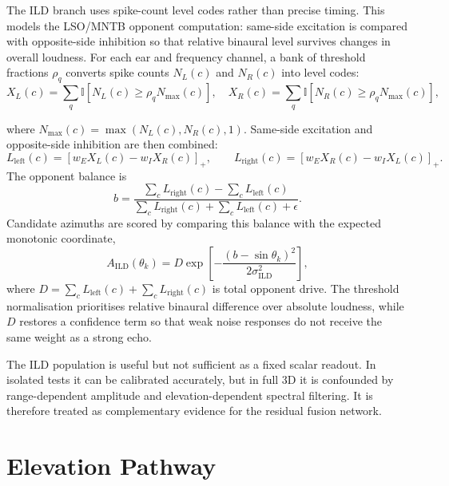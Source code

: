 The ILD branch uses spike-count level codes rather than precise timing. This models the LSO/MNTB opponent computation: same-side excitation is compared with opposite-side inhibition so that relative binaural level survives changes in overall loudness. For each ear and frequency channel, a bank of threshold fractions $\rho_q$ converts spike counts $N_L(c)$ and $N_R(c)$ into level codes:
\begin{equation}
    X_L(c)
    =
    \sum_q
    \mathbb{I}
    \left[
    N_L(c)\geq \rho_q N_{\max}(c)
    \right],
    \quad
    X_R(c)
    =
    \sum_q
    \mathbb{I}
    \left[
    N_R(c)\geq \rho_q N_{\max}(c)
    \right],
\end{equation}

where $N_{\max}(c)=\max(N_L(c),N_R(c),1)$. Same-side excitation and opposite-side inhibition are then combined:
\begin{equation}
    L_{\mathrm{left}}(c)
    =
    [w_E X_L(c)-w_I X_R(c)]_+,
    \qquad
    L_{\mathrm{right}}(c)
    =
    [w_E X_R(c)-w_I X_L(c)]_+.
\end{equation}
The opponent balance is
\begin{equation}
    b
    =
    \frac{\sum_c L_{\mathrm{right}}(c)-\sum_c L_{\mathrm{left}}(c)}
    {\sum_c L_{\mathrm{right}}(c)+\sum_c L_{\mathrm{left}}(c)+\epsilon}.
\end{equation}
Candidate azimuths are scored by comparing this balance with the expected monotonic coordinate,
\begin{equation}
    A_{\mathrm{ILD}}(\theta_k)
    =
    D\exp
    \left[
    -
    \frac{(b-\sin\theta_k)^2}{2\sigma_{\mathrm{ILD}}^2}
    \right],
\end{equation}
where $D=\sum_c L_{\mathrm{left}}(c)+\sum_c L_{\mathrm{right}}(c)$ is total opponent drive. The threshold normalisation prioritises relative binaural difference over absolute loudness, while $D$ restores a confidence term so that weak noise responses do not receive the same weight as a strong echo.

The ILD population is useful but not sufficient as a fixed scalar readout. In isolated tests it can be calibrated accurately, but in full 3D it is confounded by range-dependent amplitude and elevation-dependent spectral filtering. It is therefore treated as complementary evidence for the residual fusion network.

\section{Elevation Pathway}

